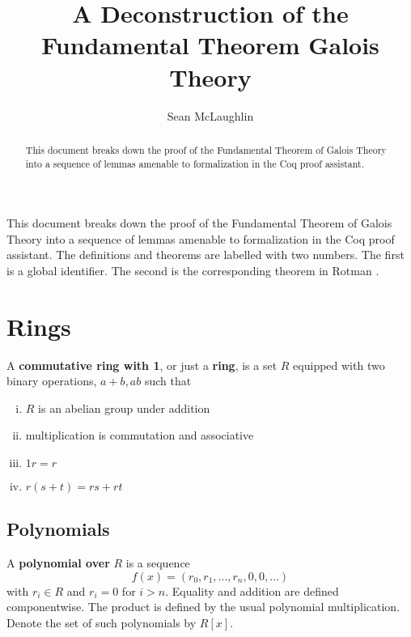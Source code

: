 \documentclass{article}
\title{A Deconstruction of the Fundamental Theorem Galois Theory}
\author{Sean McLaughlin}
\begin{document}
 
\maketitle
\begin{abstract} 
This document breaks down the proof of the Fundamental Theorem of Galois Theory
into a sequence of lemmas amenable to formalization in the Coq proof assistant.
\end{abstract} 

This document breaks down the proof of the Fundamental Theorem of Galois Theory
into a sequence of lemmas amenable to formalization in the Coq proof assistant.
The definitions and theorems are labelled with two numbers. The first is
a global identifier.  The second is the corresponding theorem in 
Rotman \cite{Rotman:GaloisTheory}. 


\section{Rings}

\begin{Definition}[1a] A \textbf{commutative ring with 1}, or just a \textbf{ring}, is a set $R$ 
equipped with two binary operations, $a + b,ab$ such that
\begin{enumerate}[(i)]
\item $R$ is an abelian group under addition
\item multiplication is commutation and associative
\item $1 r = r$
\item $r(s+t) = rs+rt$
\end{enumerate}  
\end{Definition} 

\subsection{Polynomials}

\begin{Definition}[1b] A \textbf{polynomial over} $R$ is a sequence
$$f(x) = (r_0,r_1,\ldots,r_n,0,0,\ldots)$$
with $r_i\in R$ and $r_i=0$ for $i>n$.  Equality and addition are
defined componentwise.  The product is defined by the usual
polynomial multiplication.
Denote the set of such polynomials by $R[x]$. 
\end{Definition} 
\end{document}
